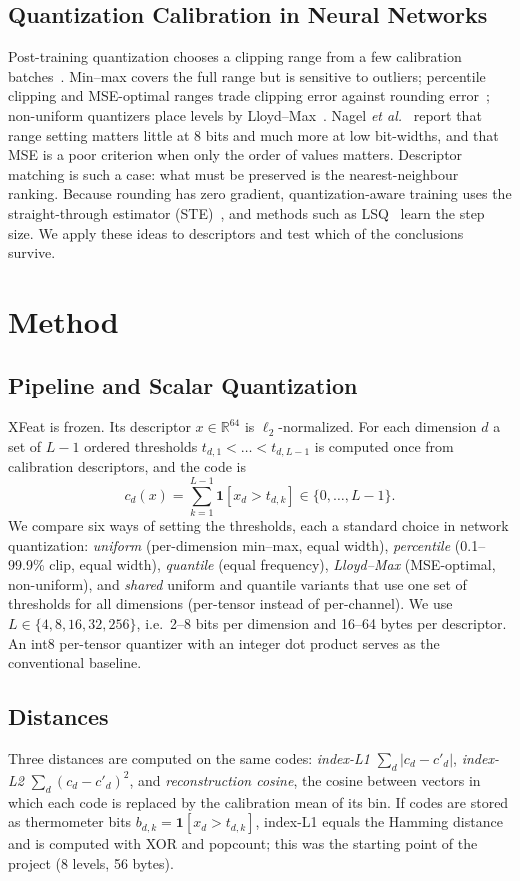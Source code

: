 \documentclass[10pt,conference]{IEEEtran}
\begin{document}
\subsection{Quantization Calibration in Neural Networks}
Post-training quantization chooses a clipping range from a few calibration batches~\cite{nagel,gholami}. Min--max covers the full range but is sensitive to outliers; percentile clipping and MSE-optimal ranges trade clipping error against rounding error~\cite{jacob,nagel}; non-uniform quantizers place levels by Lloyd--Max~\cite{lloyd}. Nagel \emph{et al.}~\cite{nagel} report that range setting matters little at 8 bits and much more at low bit-widths, and that MSE is a poor criterion when only the order of values matters. Descriptor matching is such a case: what must be preserved is the nearest-neighbour ranking. Because rounding has zero gradient, quantization-aware training uses the straight-through estimator (STE)~\cite{ste}, and methods such as LSQ~\cite{lsq} learn the step size. We apply these ideas to descriptors and test which of the conclusions survive.

\section{Method}
\subsection{Pipeline and Scalar Quantization}
XFeat is frozen. Its descriptor $x\in\mathbb{R}^{64}$ is $\ell_2$-normalized. For each dimension $d$ a set of $L-1$ ordered thresholds $t_{d,1}<\dots<t_{d,L-1}$ is computed once from calibration descriptors, and the code is
\begin{equation}
c_d(x)=\sum_{k=1}^{L-1}\mathbf{1}[x_d>t_{d,k}]\in\{0,\dots,L-1\}.
\end{equation}
We compare six ways of setting the thresholds, each a standard choice in network quantization: \emph{uniform} (per-dimension min--max, equal width), \emph{percentile} (0.1--99.9\% clip, equal width), \emph{quantile} (equal frequency), \emph{Lloyd--Max} (MSE-optimal, non-uniform), and \emph{shared} uniform and quantile variants that use one set of thresholds for all dimensions (per-tensor instead of per-channel). We use $L\in\{4,8,16,32,256\}$, i.e.\ 2--8 bits per dimension and 16--64 bytes per descriptor. An int8 per-tensor quantizer with an integer dot product serves as the conventional baseline.

\subsection{Distances}
Three distances are computed on the same codes: \emph{index-L1} $\sum_d|c_d-c'_d|$, \emph{index-L2} $\sum_d(c_d-c'_d)^2$, and \emph{reconstruction cosine}, the cosine between vectors in which each code is replaced by the calibration mean of its bin. If codes are stored as thermometer bits $b_{d,k}=\mathbf{1}[x_d>t_{d,k}]$, index-L1 equals the Hamming distance and is computed with XOR and popcount; this was the starting point of the project (8 levels, 56 bytes).
\end{document}

